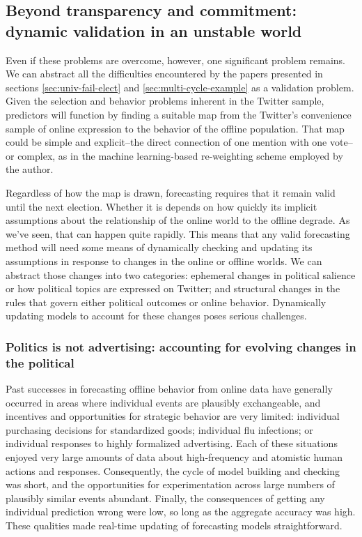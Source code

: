 \documentclass{article}
\begin{document}
\subsection{Beyond transparency and commitment: dynamic validation in
  an unstable world}
\label{sec:dynamic-validation}

Even if these problems are overcome, however, one significant problem
remains. We can abstract all the difficulties encountered by the
papers presented in sections \ref{sec:univ-fail-elect} and
\ref{sec:multi-cycle-example} as a validation problem. Given the
selection and behavior problems inherent in the Twitter sample,
predictors will function by finding a suitable map from the Twitter's
convenience sample of online expression to the behavior of the offline
population. That map could be simple and explicit--the direct
connection of one mention with one vote--or complex, as in the machine
learning-based re-weighting scheme employed by the author.

Regardless of how the map is drawn, forecasting requires that it remain
valid until the next election. Whether it is depends on how quickly
its implicit assumptions about the relationship of the online world to
the offline degrade. As we've seen, that can happen quite
rapidly. This means that any valid forecasting method will need some
means of dynamically checking and updating its assumptions in response
to changes in the online or offline worlds. We can abstract those
changes into two categories: ephemeral changes in political salience
or how political topics are expressed on Twitter; and structural
changes in the rules that govern either political outcomes or online
behavior. Dynamically updating models to account for these changes
poses serious challenges. 

\subsubsection{Politics is not advertising: accounting for evolving changes in the political}
\label{sec:acco-evolv-chang}

Past successes in forecasting offline behavior from online data have
generally occurred in areas where individual events are plausibly
exchangeable, and incentives and opportunities for strategic behavior
are very limited: individual purchasing decisions for standardized
goods; individual flu infections; or individual responses to highly
formalized advertising. Each of these situations enjoyed very large
amounts of data about high-frequency and atomistic human actions and
responses. Consequently, the cycle of model building and checking was
short, and the opportunities for experimentation across large numbers
of plausibly similar events abundant. Finally, the consequences of
getting any individual prediction wrong were low, so long as the
aggregate accuracy was high. These qualities made real-time updating
of forecasting models straightforward.
\end{document}

